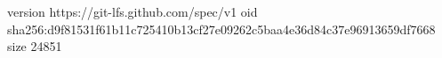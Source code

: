 version https://git-lfs.github.com/spec/v1
oid sha256:d9f81531f61b11c725410b13cf27e09262c5baa4e36d84c37e96913659df7668
size 24851
